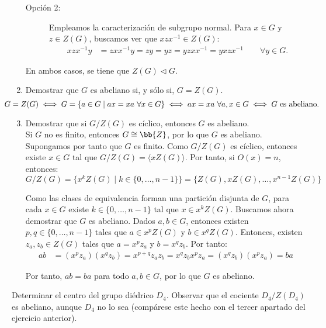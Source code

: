 \begin{ejercicio}
\begin{enumerate}
\begin{description}
            \item[Opción 2:]
            Empleamos la caracterización de subgrupo normal. Para $x\in G$ y $z\in Z(G)$, buscamos ver que $xzx^{-1}\in Z(G)$:
            \begin{align*}
                xzx^{-1}y &= zxx^{-1}y = zy = yz = yzxx^{-1} = yxzx^{-1}\qquad \forall y\in G.
            \end{align*}
        \end{description}
        En ambos casos, se tiene que $Z(G)\lhd G$.
        \item Demostrar que $G$ es abeliano si, y sólo si, $G=Z(G)$.
        \begin{equation*}
            \hspace{-1cm}G=Z(G) \iff G=\{a\in G\mid ax=xa\ \forall x\in G\} \iff ax=xa\ \forall a,x\in G \iff G\text{ es abeliano.}
        \end{equation*}
        \item Demostrar que si $G/Z(G)$ es cíclico, entonces $G$ es abeliano.\\
        
        Si $G$ no es finito, entonces $G\cong \bb{Z}$, por lo que $G$ es abeliano. Supongamos por tanto que $G$ es finito. Como $G/Z(G)$ es cíclico, entonces existe $x\in G$ tal que $G/Z(G)=\langle xZ(G)\rangle$. Por tanto, si $O(x)=n$, entonces:
        \begin{equation*}
            G/Z(G) = \{x^kZ(G)\mid k\in \{0,\ldots,n-1\}\} = \{Z(G),xZ(G),\ldots,x^{n-1}Z(G)\}
        \end{equation*}

        Como las clases de equivalencia forman una partición disjunta de $G$, para cada $x\in G$ existe $k\in \{0,\ldots,n-1\}$ tal que $x\in x^kZ(G)$. Buscamos ahora demostrar que $G$ es abeliano. Dados $a,b\in G$, entonces existen $p,q\in \{0,\ldots,n-1\}$ tales que $a\in x^pZ(G)$ y $b\in x^qZ(G)$. Entonces, existen $z_a,z_b\in Z(G)$ tales que $a=x^pz_a$ y $b=x^qz_b$. Por tanto:
        \begin{align*}
            ab &= (x^pz_a)(x^qz_b) = x^{p+q}z_az_b = x^qz_b x^pz_a = (x^qz_b)(x^pz_a) = ba
        \end{align*}

        Por tanto, $ab=ba$ para todo $a,b\in G$, por lo que $G$ es abeliano.        
    \end{enumerate}
\end{ejercicio}

\begin{ejercicio}
    Determinar el centro del grupo diédrico $D_4$. Observar que el cociente $D_4/Z(D_4)$ es abeliano, aunque $D_4$ no lo sea (compárese este hecho con el tercer apartado del ejercicio anterior).
\end{ejercicio}

